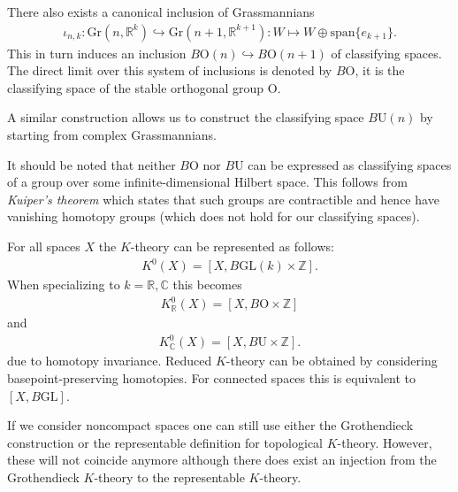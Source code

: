 {\begin{property}
        There also exists a canonical inclusion of Grassmannians
        \begin{gather}
            \iota_{n,k}:\text{Gr}(n, \mathbb{R}^k)\hookrightarrow \text{Gr}(n+1, \mathbb{R}^{k+1}):W\mapsto W\oplus\text{span}\{e_{k+1}\}.
        \end{gather}
        This in turn induces an inclusion $B\text{O}(n)\hookrightarrow B\text{O}(n+1)$ of classifying spaces. The direct limit over this system of inclusions is denoted by $B\text{O}$, it is the classifying space of the stable orthogonal group $\text{O}$.
    \end{property}
    \begin{remark*}
        A similar construction allows us to construct the classifying space $B\text{U}(n)$ by starting from complex Grassmannians.
    \end{remark*}
    \begin{remark}\label{k:kuiper_remark}
        It should be noted that neither $B\text{O}$ nor $B\text{U}$ can be expressed as classifying spaces of a group over some infinite-dimensional Hilbert space. This follows from \textit{Kuiper's theorem} which states that such groups are contractible and hence have vanishing homotopy groups (which does not hold for our classifying spaces).
    \end{remark}

    \begin{property}
        For all spaces $X$ the $K$-theory can be represented as follows:
        \begin{gather}
            K^0(X) = [X, B\text{GL}(k)\times\mathbb{Z}].
        \end{gather}
        When specializing to $k=\mathbb{R},\mathbb{C}$ this becomes
        \begin{gather}
            K^0_{\mathbb{R}}(X) = [X, B\text{O}\times\mathbb{Z}]
        \end{gather}
        and
        \begin{gather}
            K^0_{\mathbb{C}}(X) = [X, B\text{U}\times\mathbb{Z}].
        \end{gather}
        due to homotopy invariance. Reduced $K$-theory can be obtained by considering basepoint-preserving homotopies. For connected spaces this is equivalent to $[X, B\text{GL}]$.
    \end{property}

    \begin{remark}
        If we consider noncompact spaces one can still use either the Grothendieck construction or the representable definition for topological $K$-theory. However, these will not coincide anymore although there does exist an injection from the Grothendieck $K$-theory to the representable $K$-theory.
    \end{remark}

}
